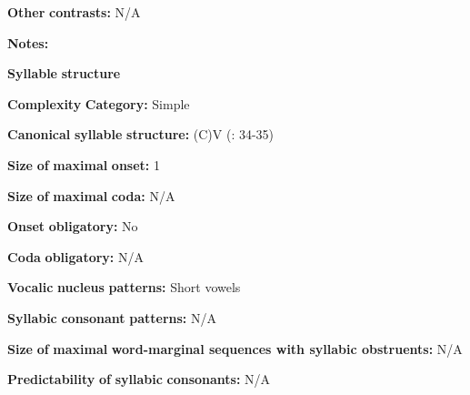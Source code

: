 \begin{styleBody}
\textbf{Other} \textbf{contrasts:} N/A
\end{styleBody}

\begin{styleBody}
\textbf{Notes:}
\end{styleBody}

\begin{styleBody}
\textbf{Syllable} \textbf{structure}
\end{styleBody}

\begin{styleBody}
\textbf{Complexity} \textbf{Category:} Simple
\end{styleBody}

\begin{styleBody}
\textbf{Canonical} \textbf{syllable} \textbf{structure:} (C)V (\citealt{BlackingsFabb2003}: 34-35)
\end{styleBody}

\begin{styleBody}
\textbf{Size} \textbf{of} \textbf{maximal} \textbf{onset:} 1
\end{styleBody}

\begin{styleBody}
\textbf{Size} \textbf{of} \textbf{maximal} \textbf{coda:} N/A
\end{styleBody}

\begin{styleBody}
\textbf{Onset} \textbf{obligatory:} No
\end{styleBody}

\begin{styleBody}
\textbf{Coda} \textbf{obligatory:} N/A
\end{styleBody}

\begin{styleBody}
\textbf{Vocalic} \textbf{nucleus} \textbf{patterns:} Short vowels
\end{styleBody}

\begin{styleBody}
\textbf{Syllabic} \textbf{consonant} \textbf{patterns:} N/A
\end{styleBody}

\begin{styleBody}
\textbf{Size} \textbf{of} \textbf{maximal} \textbf{word{}-marginal sequences with syllabic obstruents:} N/A
\end{styleBody}

\begin{styleBody}
\textbf{Predictability} \textbf{of} \textbf{syllabic} \textbf{consonants:} N/A
\end{styleBody}

